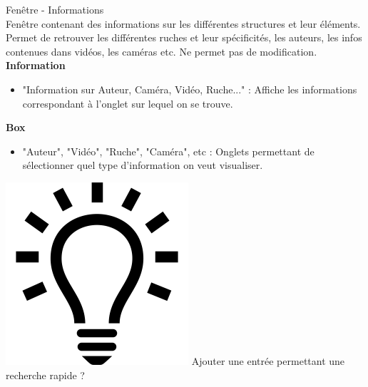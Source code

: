 \documentclass[11pt,french,a4paper]{report}
\begin{document}
\begin{multicols}{2}
\begin{small}
\Large Fenêtre - Informations \\ \normalsize 
    Fenêtre contenant des informations sur les différentes structures et leur éléments. Permet de retrouver les différentes ruches
    et leur spécificités, les auteurs, les infos contenues dans vidéos, les caméras etc. Ne permet pas de modification. \\
\large \textbf{Information} \normalsize
    \begin{itemize}[label=, leftmargin=*,parsep=0cm,itemsep=0cm,topsep=0cm]
        \item "Information sur Auteur, Caméra, Vidéo, Ruche..." : Affiche les informations correspondant à l'onglet sur lequel on se trouve.
    \end{itemize}
\large \textbf{Box} \normalsize
    \begin{itemize}[label=, leftmargin=*,parsep=0cm,itemsep=0cm,topsep=0cm]
        \item "Auteur", "Vidéo", "Ruche", "Caméra", etc : Onglets permettant de sélectionner quel type d'information on veut visualiser.
    \end{itemize}
    \includegraphics[scale=0.05]{../images/logo/logo_ampoule} Ajouter une entrée permettant une recherche rapide ? \\

\columnbreak

\dotfill \\


\end{small}
\end{multicols}
\end{document}
